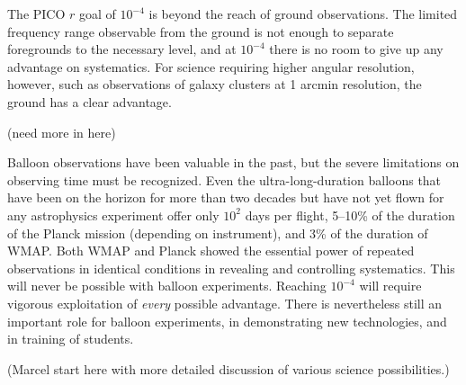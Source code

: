 The PICO $r$ goal of $10^{-4}$ is beyond the reach of ground observations.  The limited frequency range observable from the ground is not enough to separate foregrounds to the necessary level, and at $10^{-4}$ there is no room to give up any advantage on systematics.  For science requiring higher angular resolution, however, such as observations of galaxy clusters at 1 arcmin resolution, the ground has a clear advantage.

(need more in here)

Balloon observations have been valuable in the past, but the severe limitations on observing time must be recognized.  Even the ultra-long-duration balloons that have been on the horizon for more than two decades but have not yet flown for any astrophysics experiment offer only $10^2$ days per flight, 5--10\% of the duration of the Planck mission (depending on instrument), and 3\% of the duration of WMAP.  Both WMAP and Planck showed the essential power of repeated observations in identical conditions in revealing and controlling systematics.  This will never be possible with balloon experiments.  Reaching $10^{-4}$ will require vigorous exploitation of {\it every\/} possible advantage.  There is nevertheless still an important role for balloon experiments, in demonstrating new technologies, and in training of students.

(Marcel start here with more detailed discussion of various science possibilities.) 
